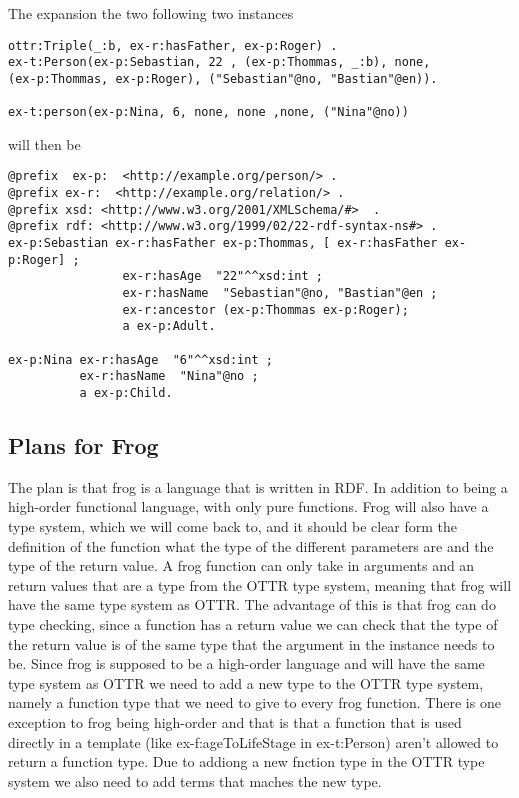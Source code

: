 The expansion the two following two instances

\begin{lstlisting}[frame=single]
ottr:Triple(_:b, ex-r:hasFather, ex-p:Roger) .
ex-t:Person(ex-p:Sebastian, 22 , (ex-p:Thommas, _:b), none, 
(ex-p:Thommas, ex-p:Roger), ("Sebastian"@no, "Bastian"@en)).

ex-t:person(ex-p:Nina, 6, none, none ,none, ("Nina"@no))
\end{lstlisting}

will then be
\begin{lstlisting}[frame=single, language=turtle]
@prefix  ex-p:  <http://example.org/person/> . 
@prefix ex-r:  <http://example.org/relation/> . 
@prefix xsd: <http://www.w3.org/2001/XMLSchema/#>  . 
@prefix rdf: <http://www.w3.org/1999/02/22-rdf-syntax-ns#> .
ex-p:Sebastian ex-r:hasFather ex-p:Thommas, [ ex-r:hasFather ex-p:Roger] ; 
                ex-r:hasAge  "22"^^xsd:int ; 
                ex-r:hasName  "Sebastian"@no, "Bastian"@en ;
                ex-r:ancestor (ex-p:Thommas ex-p:Roger);
                a ex-p:Adult.

ex-p:Nina ex-r:hasAge  "6"^^xsd:int ; 
          ex-r:hasName  "Nina"@no ;
          a ex-p:Child.
\end{lstlisting}

\subsection{Plans for Frog}
The plan is that frog is a language that is written in RDF. In addition to being a high-order functional language, 
with only pure functions. 
Frog will also have a type system, which we will come back to, and it should be clear form the definition of 
the function what the type of the different parameters are and the type of the return value. 
A frog function can only take in arguments and an return values that are a type from the OTTR type system, 
meaning that frog will have the same type system as OTTR.
The advantage of this is that frog can do type checking, since a function has a return value we can check that 
the type of the return value is of the same type that the argument in the instance needs to be.
Since frog is supposed to be a high-order language and will have the same type system as OTTR  
we need to add a new type to the OTTR type system, namely a function type that we need to give to every frog function. 
There is one exception to frog being high-order and that is that a function that is used directly in a 
template (like ex-f:ageToLifeStage in ex-t:Person) aren't allowed to return a function type. Due to addiong a new 
fnction type in the OTTR type system we also need to add terms that maches the new type. 

